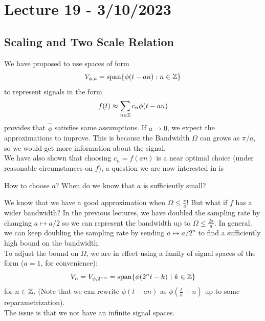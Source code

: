 \documentclass{article}
\begin{document}
\newpage
\section{Lecture 19 - 3/10/2023}
\subsection{Scaling and Two Scale Relation}

We have proposed to use spaces of form
\[V_{\phi, a} = \operatorname{span} \{\phi(t - an): n \in \mathbb{Z}\}\]
to represent signals in the form
\[f(t) \approx \sum_{n \in \mathbb{Z}} c_n \phi(t - an)\]
provides that $\hat{\phi}$ satisfies same assumptions. If $a \to 0$, we expect the approximations to improve. This is because the Bandwidth $\Omega$ can grows as $\pi/a$, so we would get more information about the signal.\\

We have also shown that choosing $c_n = f(an)$ is a near optimal choice (under reasonable circumstances on $f$), a question we are now interested in is
\begin{question}
    How to choose $a$? When do we know that $a$ is sufficiently small?
\end{question}

We know that we have a good approximation when $\Omega \leq \frac{\pi}{a}$! But what if $f$ has a wider bandwidth? In the previous lectures, we have doubled the sampling rate by changing $a \mapsto a/2$ so we can represent the bandwidth up to $\Omega \leq \frac{2\pi}{a}$. In general, we can keep doubling the sampling rate by sending $a \mapsto a/2^n$ to find a sufficiently high bound on the bandwidth.\\

To adjust the bound on $\Omega$, we are in effect using a family of signal spaces of the form ($a = 1$, for convenience):
\[V_n = V_{\phi, 2^{-n}} = \operatorname{span} \{\phi(2^n t - k)\ |\ k \in \mathbb{Z}\}\]
for $n \in \mathbb{Z}$. (Note that we can rewrite $\phi(t - an)$ as $\phi(\frac{t}{a} - n)$ up to some reparametrization).\\

The issue is that we not have an infinite signal spaces.
\end{document}
